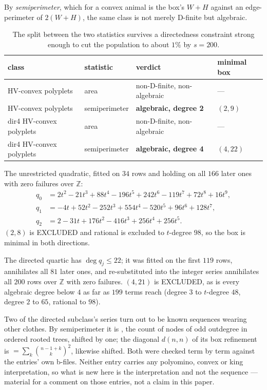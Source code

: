 \documentclass[11pt]{article}
\newcommand{\Z}{\mathbb{Z}}
\begin{document}
By \emph{semiperimeter}, which for a convex animal is the box's $W + H$ against
an edge-perimeter of $2(W{+}H)$, the same class is not merely D-finite but
algebraic.

\begin{table}[H]
\centering\small
\begin{tabular}{l l l l}
\toprule
class & statistic & verdict & minimal box \\
\midrule
HV-convex polyplets & area & non-D-finite, non-algebraic & --- \\
HV-convex polyplets & semiperimeter & \textbf{algebraic, degree 2} & $(2,9)$ \\
dir4 HV-convex polyplets & area & non-D-finite, non-algebraic & --- \\
dir4 HV-convex polyplets & semiperimeter & \textbf{algebraic, degree 4} & $(4,22)$ \\
\bottomrule
\end{tabular}
\caption{The split between the two statistics survives a directedness
constraint strong enough to cut the population to about $1\%$ by $s = 200$.}
\label{tab:perim}
\end{table}

The unrestricted quadratic, fitted on $34$ rows and holding on all $166$ later
ones with zero failures over $\Z$:
\[
\begin{aligned}
q_0 &= 2t^2 - 21t^3 + 88t^4 - 196t^5 + 242t^6 - 119t^7 + 72t^8 + 16t^9, \\
q_1 &= -4t + 52t^2 - 252t^3 + 554t^4 - 520t^5 + 96t^6 + 128t^7, \\
q_2 &= 2 - 31t + 176t^2 - 416t^3 + 256t^4 + 256t^5 .
\end{aligned}
\]
$(2,8)$ is EXCLUDED and rational is excluded to $t$-degree $98$, so the box is
minimal in both directions.

The directed quartic has $\deg q_j \le 22$; it was fitted on the first $119$
rows, annihilates all $81$ later ones, and re-substituted into the integer
series annihilates all $200$ rows over $\Z$ with zero failures. $(4,21)$ is
EXCLUDED, as is every algebraic degree below $4$ as far as $199$ terms reach
(degree $3$ to $t$-degree $48$, degree $2$ to $65$, rational to $98$).

Two of the directed subclass's series turn out to be known sequences wearing
other clothes. By semiperimeter it is , the count of nodes of odd
outdegree in ordered rooted trees, shifted by one; the diagonal $d(n,n)$ of its
box refinement is  $= \sum_k \binom{n-1+k}{k}^2$, likewise
shifted. Both were checked term by term against the entries' own b-files.
Neither entry carries any polyomino, convex or king interpretation, so what is
new here is the interpretation and not the sequence --- material for a comment
on those entries, not a claim in this paper.
\end{document}
